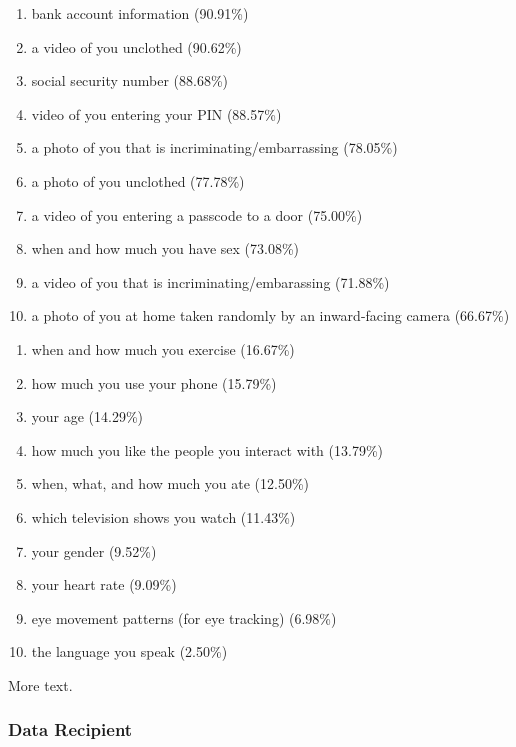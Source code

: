 \documentclass{acm_proc_article-sp}
\begin{document}
\begin{enumerate} \itemsep1pt \parskip0pt 
  \item bank account information (90.91\%)
  \item a video of you unclothed (90.62\%)
  \item social security number (88.68\%)
  \item video of you entering your PIN (88.57\%)
  \item a photo of you that is incriminating/embarrassing (78.05\%)
  \item a photo of you unclothed (77.78\%)
  \item a video of you entering a passcode to a door (75.00\%)
  \item when and how much you have sex (73.08\%)
  \item a video of you that is incriminating/embarassing (71.88\%)
  \item a photo of you at home taken randomly by an inward-facing camera (66.67\%)  \\[-.8cm]
\end{enumerate}

\begin{enumerate} \itemsep1pt \parskip0pt 
  \setcounter{enumi}{63}
  \item when and how much you exercise (16.67\%)
  \item how much you use your phone (15.79\%)
  \item your age (14.29\%)
  \item how much you like the people you interact with (13.79\%)
  \item when, what, and how much you ate (12.50\%)
  \item which television shows you watch (11.43\%)
  \item your gender (9.52\%)
  \item your heart rate (9.09\%)
  \item eye movement patterns (for eye tracking) (6.98\%)
  \item the language you speak (2.50\%)\\[-.8cm]
\end{enumerate}

More text.

\subsubsection{Data Recipient}
\end{document}
